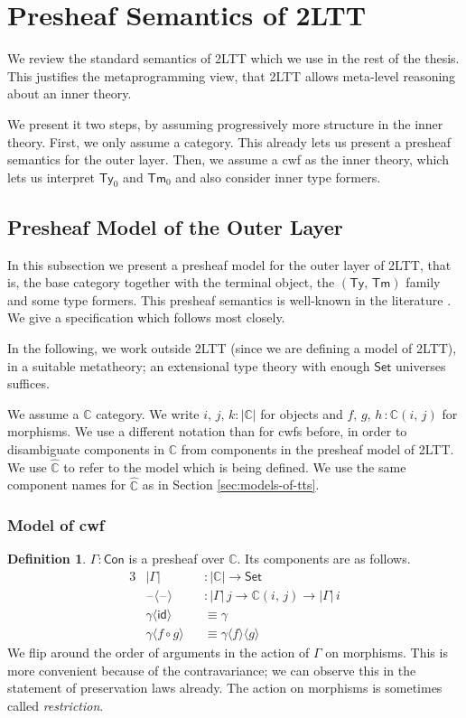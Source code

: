 \documentclass[12pt,a4paper,twoside,openany]{book}
\theoremstyle{remark}
\theoremstyle{definition}
\newtheorem{mydefinition}{Definition}
\theoremstyle{theorem}
\newcommand{\mbb}[1]{\mathbb{#1}}
\newcommand{\id}{\mathsf{id}}
\newcommand{\Con}{\mathsf{Con}}
\newcommand{\Tm}{\mathsf{Tm}}
\newcommand{\Ty}{\mathsf{Ty}}
\newcommand{\blank}{\mathord{\hspace{1pt}\text{--}\hspace{1pt}}}
\newcommand{\Set}{\mathsf{Set}}
\newcommand{\mbbC}{\mbb{C}}
\newcommand{\hmbbC}{\hat{\mbb{C}}}
\newcommand{\lab}{\langle}
\newcommand{\rab}{\rangle}
\begin{document}
\section{Presheaf Semantics of 2LTT}


We review the standard semantics of 2LTT which we use in the rest of the
thesis. This justifies the metaprogramming view, that 2LTT allows meta-level
reasoning about an inner theory.

We present it two steps, by assuming progressively more structure in the inner
theory. First, we only assume a category. This already lets us present a
presheaf semantics for the outer layer. Then, we assume a cwf as the inner
theory, which lets us interpret $\Ty_0$ and $\Tm_0$ and also consider inner type
formers.

\subsection{Presheaf Model of the Outer Layer}

In this subsection we present a presheaf model for the outer layer of 2LTT, that
is, the base category together with the terminal object, the $(\Ty,\,\Tm)$
family and some type formers. This presheaf semantics is well-known in the
literature \cite{Hofmann97syntaxand}. We give a specification which follows
\cite{huber-thesis} most closely.

In the following, we work outside 2LTT (since we are defining a model of 2LTT),
in a suitable metatheory; an extensional type theory with enough $\Set$
universes suffices.

We assume a $\mbbC$ category. We write $i,\,j,\,k : |\mbbC|$ for objects and
$f,\,g,\,h\,: \mbbC(i,\,j)$ for morphisms. We use a different notation than for
cwfs before, in order to disambiguate components in $\mbbC$ from components in
the presheaf model of 2LTT. We use $\hmbbC$ to refer to the model which is being
defined. We use the same component names for $\hmbbC$ as in Section
\ref{sec:models-of-tts}.

\subsubsection{Model of cwf}

\begin{mydefinition}
$\Gamma : \Con$ is a presheaf over $\mbbC$. Its components
are as follows.
\begin{alignat*}{3}
  & |\Gamma|             &&: |\mbbC| \to \Set \\
  & \blank\lab\blank\rab &&: |\Gamma|\,j \to \mbbC(i,\,j) \to |\Gamma|\,i\\
  & \gamma\lab\id\rab &&\equiv \gamma \\
  & \gamma\lab f\circ g\rab &&\equiv \gamma \lab f \rab \lab g \rab
\end{alignat*}
We flip around the order of arguments in the action of $\Gamma$ on
morphisms. This is more convenient because of the contravariance; we can observe
this in the statement of preservation laws already. The action on morphisms is
sometimes called \emph{restriction}.
\end{mydefinition}
\end{document}
